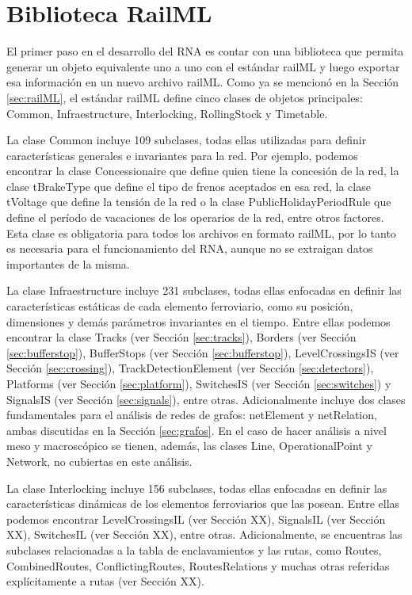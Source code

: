 \section{Biblioteca RailML}
	\label{sec:Biblioteca}
	
    El primer paso en el desarrollo del RNA es contar con una biblioteca que permita generar un objeto equivalente uno a uno con el estándar railML y luego exportar esa información en un nuevo archivo railML. Como ya se mencionó en la Sección \ref{sec:railML}, el estándar railML define cinco clases de objetos principales: Common, Infraestructure, Interlocking, RollingStock y Timetable. 

    La clase Common incluye 109 subclases, todas ellas utilizadas para definir características generales e invariantes para la red. Por ejemplo, podemos encontrar la clase Concessionaire que define quien tiene la concesión de la red, la clase tBrakeType que define el tipo de frenos aceptados en esa red, la clase tVoltage que define la tensión de la red o la clase PublicHolidayPeriodRule que define el período de vacaciones de los operarios de la red, entre otros factores. Esta clase es obligatoria para todos los archivos en formato railML, por lo tanto es necesaria para el funcionamiento del RNA, aunque no se extraigan datos importantes de la misma.

    La clase Infraestructure incluye  231 subclases, todas ellas enfocadas en definir las características estáticas de cada elemento ferroviario, como su posición, dimensiones y demás parámetros invariantes en el tiempo. Entre ellas podemos encontrar la clase Tracks (ver Sección \ref{sec:tracks}), Borders (ver Sección \ref{sec:bufferstop}), BufferStops (ver Sección \ref{sec:bufferstop}), LevelCrossingsIS (ver Sección \ref{sec:crossing}), TrackDetectionElement (ver Sección \ref{sec:detectors}), Platforms (ver Sección \ref{sec:platform}), SwitchesIS (ver Sección \ref{sec:switches}) y SignalsIS (ver Sección \ref{sec:signals}), entre otras. Adicionalmente incluye dos clases fundamentales para el análisis de redes de grafos: netElement y netRelation, ambas discutidas en la Sección \ref{sec:grafos}. En el caso de hacer análisis a nivel meso y macroscópico se tienen, además, las clases Line, OperationalPoint y Network, no cubiertas en este análisis.

	
    La clase Interlocking incluye 156 subclases, todas ellas enfocadas en definir las características dinámicas de los elementos ferroviarios que las posean. Entre ellas podemos encontrar LevelCrossingsIL (ver Sección XX), SignalsIL (ver Sección XX), SwitchesIL (ver Sección XX), entre otras. Adicionalmente, se encuentras las subclases relacionadas a la tabla de enclavamientos y las rutas, como Routes, CombinedRoutes, ConflictingRoutes, RoutesRelations y muchas otras referidas explícitamente a rutas (ver Sección XX). 
    
